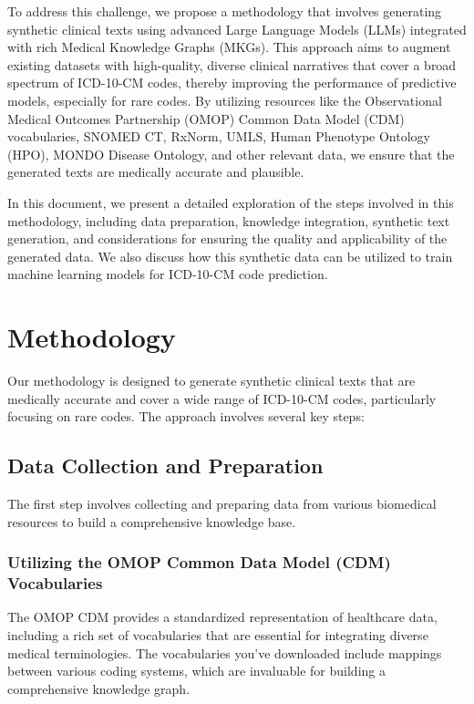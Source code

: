 \documentclass[12pt, a4paper]{article}
\begin{document}
To address this challenge, we propose a methodology that involves generating synthetic clinical texts using advanced Large Language Models (LLMs) integrated with rich Medical Knowledge Graphs (MKGs). This approach aims to augment existing datasets with high-quality, diverse clinical narratives that cover a broad spectrum of ICD-10-CM codes, thereby improving the performance of predictive models, especially for rare codes. By utilizing resources like the Observational Medical Outcomes Partnership (OMOP) Common Data Model (CDM) vocabularies, SNOMED CT, RxNorm, UMLS, Human Phenotype Ontology (HPO), MONDO Disease Ontology, and other relevant data, we ensure that the generated texts are medically accurate and plausible.

In this document, we present a detailed exploration of the steps involved in this methodology, including data preparation, knowledge integration, synthetic text generation, and considerations for ensuring the quality and applicability of the generated data. We also discuss how this synthetic data can be utilized to train machine learning models for ICD-10-CM code prediction.

\section{Methodology}

Our methodology is designed to generate synthetic clinical texts that are medically accurate and cover a wide range of ICD-10-CM codes, particularly focusing on rare codes. The approach involves several key steps:

\subsection{Data Collection and Preparation}

The first step involves collecting and preparing data from various biomedical resources to build a comprehensive knowledge base.

\subsubsection{Utilizing the OMOP Common Data Model (CDM) Vocabularies}

The OMOP CDM provides a standardized representation of healthcare data, including a rich set of vocabularies that are essential for integrating diverse medical terminologies. The vocabularies you've downloaded include mappings between various coding systems, which are invaluable for building a comprehensive knowledge graph.
\end{document}
